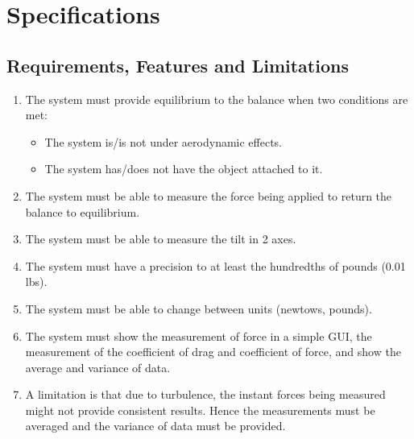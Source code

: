 \section{Specifications}
	\subsection{Requirements, Features and Limitations}
		\begin{enumerate}
			\item The system must provide equilibrium to the balance when two conditions are met:
			
			\begin{itemize}
				\item The system is/is not under aerodynamic effects.
				\item The system has/does not have the object attached to it.
			\end{itemize}
			
			\item The system must be able to measure the force being applied to return the balance
			to equilibrium.

			\item The system must be able to measure the tilt in 2 axes.

			\item The system must have a precision to at least the hundredths of pounds (0.01 lbs).

			\item The system must be able to change between units (newtows, pounds).

			\item The system must show the measurement of force in a simple GUI, the measurement of the coefficient of drag and coefficient of force, and show the average and variance of data.

			\item A limitation is that due to turbulence, the instant forces being measured might not provide consistent results. Hence the measurements must be averaged and the variance of data must be provided.
		\end{enumerate}


